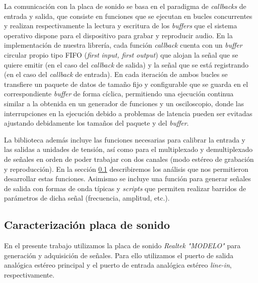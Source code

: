 \documentclass[a4paper,11pt]{article}
\begin{document}
	La comunicación con la placa de sonido se basa en el paradigma de \emph{callbacks} de entrada y salida, que consiste en funciones que se ejecutan en bucles concurrentes y realizan respectivamente la lectura y escritura de los \emph{buffers} que el sistema operativo dispone para el dispositivo para grabar y reproducir audio. En la implementación de nuestra librería, cada función \emph{callback} cuenta con un \emph{buffer} circular propio tipo FIFO (\emph{first input, first output}) que alojan la señal que se quiere emitir (en el caso del \emph{callback} de salida) y la señal que se está registrando (en el caso del \emph{callback} de entrada). En cada iteración de ambos bucles se transfiere un paquete de datos de tamaño fijo y configurable que se guarda en el correspondiente \emph{buffer} de forma cíclica, permitiendo una ejecución continua similar a la obtenida en un generador de funciones y un osciloscopio, donde las interrupciones en la ejecución debido a problemas de latencia pueden ser evitadas ajustando debidamente los tamaños del paquete y del \emph{buffer}.

	La biblioteca además incluye las funciones necesarias para calibrar la entrada y las salidas a unidades de tensión, así como para el multiplexado y demultiplexado de señales en orden de poder trabajar con dos canales (modo estéreo de grabación y reproducción). En la sección \ref{sec:caracterizacion} describiremos los análisis que nos permitieron desarrollar estas funciones. Asimismo se incluye una función para generar señales de salida con formas de onda típicas y \emph{scripts} que permiten realizar barridos de parámetros de dicha señal (frecuencia, amplitud, etc.).
	
    \clearpage
	
	\subsection{Caracterización placa de sonido}
	\label{sec:caracterizacion}

En el presente trabajo utilizamos la placa de sonido \emph{Realtek
"MODELO"} para generación y adquisición de señales.  Para ello
utilizamos el puerto de salida analógica estéreo principal y el puerto
de entrada analógica estéreo \emph{line-in}, respectivamente.
\end{document}

